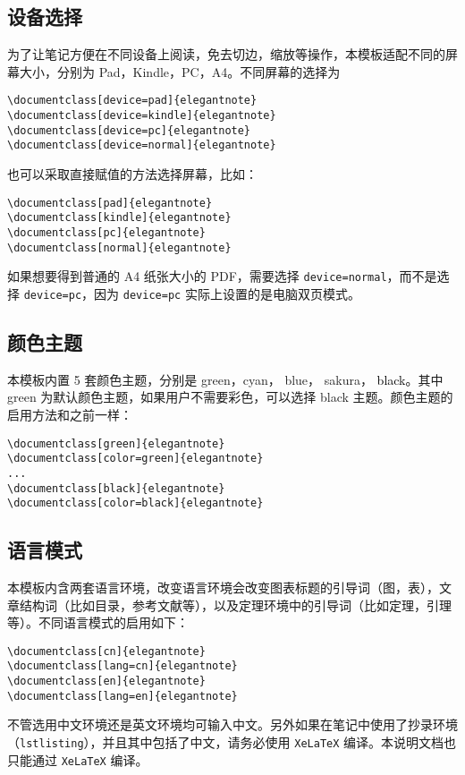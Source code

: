 \documentclass[cn,pad,11pt,green,geye]{../elegantnote}
\begin{document}
\subsection{设备选择}
为了让笔记方便在不同设备上阅读，免去切边，缩放等操作，本模板适配不同的屏幕大小，分别为 Pad，Kindle，PC，A4。不同屏幕的选择为
\begin{lstlisting}[frame=none]  
\documentclass[device=pad]{elegantnote}
\documentclass[device=kindle]{elegantnote}
\documentclass[device=pc]{elegantnote}
\documentclass[device=normal]{elegantnote}
\end{lstlisting}
\begin{note}
也可以采取直接赋值的方法选择屏幕，比如：
\end{note}
\begin{lstlisting}[frame=none]  
\documentclass[pad]{elegantnote}
\documentclass[kindle]{elegantnote}
\documentclass[pc]{elegantnote}
\documentclass[normal]{elegantnote}
\end{lstlisting}

\begin{note}
如果想要得到普通的 A4 纸张大小的 PDF，需要选择 \lstinline{device=normal}，而不是选择 \lstinline{device=pc}，因为  \lstinline{device=pc} 实际上设置的是电脑双页模式。
\end{note}

\subsection{颜色主题}
本模板内置 5 套颜色主题，分别是 \textcolor{egreen}{green}，\textcolor{ecyan}{cyan}， \textcolor{eblue}{blue}， \textcolor{sakura}{sakura}， \textcolor{black}{black}。其中 green 为默认颜色主题，如果用户不需要彩色，可以选择 black 主题。颜色主题的启用方法和之前一样：
\begin{lstlisting}[frame=none]  
\documentclass[green]{elegantnote}
\documentclass[color=green]{elegantnote}
...
\documentclass[black]{elegantnote}
\documentclass[color=black]{elegantnote}
\end{lstlisting}

\subsection{语言模式}
本模板内含两套语言环境，改变语言环境会改变图表标题的引导词（图，表），文章结构词（比如目录，参考文献等），以及定理环境中的引导词（比如定理，引理等）。不同语言模式的启用如下：
\begin{lstlisting}[frame=none]  
\documentclass[cn]{elegantnote} 
\documentclass[lang=cn]{elegantnote}
\documentclass[en]{elegantnote} 
\documentclass[lang=en]{elegantnote}
\end{lstlisting}
\begin{note}
不管选用中文环境还是英文环境均可输入中文。另外如果在笔记中使用了抄录环境（\lstinline{lstlisting}），并且其中包括了中文，请务必使用 \lstinline{XeLaTeX} 编译。本说明文档也只能通过 \lstinline{XeLaTeX} 编译。
\end{note}
\end{document}
